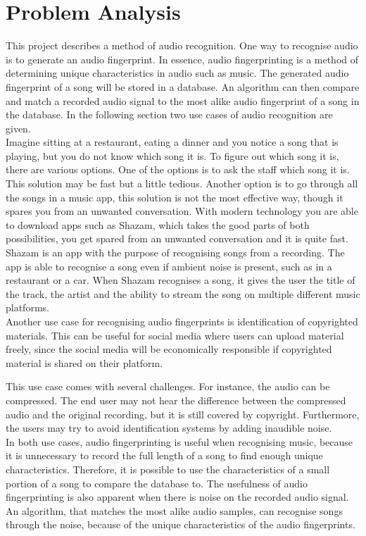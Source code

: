 \chapter{Problem Analysis}
This project describes a method of audio recognition. One way to recognise audio is to generate an audio fingerprint. In essence, audio fingerprinting is a method of determining unique characteristics in audio such as music. The generated audio fingerprint of a song will be stored in a database. An algorithm can then compare and match a recorded audio signal to the most alike audio fingerprint of a song in the database. In the following section two use cases of audio recognition are given.\\

Imagine sitting at a restaurant, eating a dinner and you notice a song that is playing, but you do not know which song it is. To figure out which song it is, there are various options. One of the options is to ask the staff which song it is. This solution may be fast but a little tedious. Another option is to go through all the songs in a music app, this solution is not the most effective way, though it spares you from an unwanted conversation. With modern technology you are able to download apps such as Shazam, which takes the good parts of both possibilities, you get spared from an unwanted conversation and it is quite fast.\\
Shazam is an app with the purpose of recognising songs from a recording. The app is able to recognise a song even if ambient noise is present, such as in a restaurant or a car. When Shazam recognises a song, it gives the user the title of the track, the artist and the ability to stream the song on multiple different music platforms. 
\cite{ShazamDescription} \\
Another use case for recognising audio fingerprints is identification of copyrighted materials. This can be useful for social media where users can upload material freely, since the social media will be economically responsible if copyrighted material is shared on their platform.

This use case comes with several challenges. For instance, the audio can be compressed. The end user may not hear the difference between the compressed audio and the original recording, but it is still covered by copyright. Furthermore, the users may try to avoid identification systems by adding inaudible noise. 
\cite{haitsma2003highly}\\
In both use cases, audio fingerprinting is useful when recognising music, because it is unnecessary to record the full length of a song to find enough unique characteristics. Therefore, it is possible to use the characteristics of a small portion of a song to compare the database to. 
The usefulness of audio fingerprinting is also apparent when there is noise on the recorded audio signal. An algorithm, that matches the most alike audio samples, can recognise songs through the noise, because of the unique characteristics of the audio fingerprints. 
